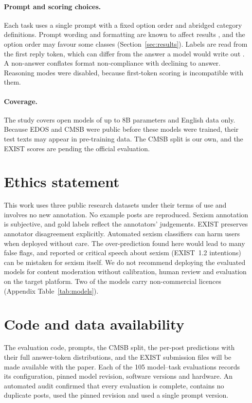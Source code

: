 \documentclass[11pt]{article}
\begin{document}
\paragraph{Prompt and scoring choices.} Each task uses a single prompt with a fixed option order and abridged category definitions. Prompt wording and formatting are known to affect results \citep{reuver2025tell,sclar2024quantifying}, and the option order may favour some classes (Section~\ref{sec:results}). Labels are read from the first reply token, which can differ from the answer a model would write out \citep{wang2024myanswer}. A non-answer conflates format non-compliance with declining to answer. Reasoning modes were disabled, because first-token scoring is incompatible with them.

\paragraph{Coverage.} The study covers open models of up to 8B parameters and English data only. Because EDOS and CMSB were public before these models were trained, their test texts may appear in pre-training data. The CMSB split is our own, and the EXIST scores are pending the official evaluation.

\section*{Ethics statement}
This work uses three public research datasets under their terms of use and involves no new annotation. No example posts are reproduced. Sexism annotation is subjective, and gold labels reflect the annotators' judgements. EXIST preserves annotator disagreement explicitly. Automated sexism classifiers can harm users when deployed without care. The over-prediction found here would lead to many false flags, and reported or critical speech about sexism (EXIST~1.2 intentions) can be mistaken for sexism itself. We do not recommend deploying the evaluated models for content moderation without calibration, human review and evaluation on the target platform. Two of the models carry non-commercial licences (Appendix Table~\ref{tab:models}).

\section*{Code and data availability}
The evaluation code, prompts, the CMSB split, the per-post predictions with their full answer-token distributions, and the EXIST submission files will be made available with the paper. Each of the 105 model--task evaluations records its configuration, pinned model revision, software versions and hardware. An automated audit confirmed that every evaluation is complete, contains no duplicate posts, used the pinned revision and used a single prompt version.
\end{document}

